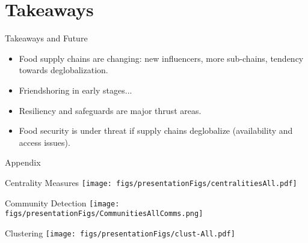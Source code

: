 \documentclass[10pt,xcolor={dvipsnames}]{beamer}
\begin{document}
\section{Takeaways}
\begin{frame}{Takeaways and Future}
    \begin{itemize}\itemsep20pt
        \item[\ding{213}] Food supply chains are changing: new influencers, more sub-chains, tendency towards deglobalization. 
        
        \item[\ding{213}] Friendshoring in early stages...
        \item[\ding{213}] Resiliency and safeguards are major thrust areas.
        \item[\ding{213}] Food security is under threat if supply chains deglobalize (availability and access issues).
    \end{itemize}
\end{frame}
\appendix

\begin{frame}[plain]
    \Large Appendix

\end{frame}
\begin{frame}{Centrality Measures}
    \texttt{[image: figs/presentationFigs/centralitiesAll.pdf]}
\end{frame}
\begin{frame}{Community Detection}
    \texttt{[image: figs/presentationFigs/CommunitiesAllComms.png]}
\end{frame}

\begin{frame}{Clustering}
    \texttt{[image: figs/presentationFigs/clust-All.pdf]}
\end{frame}
\end{document}
